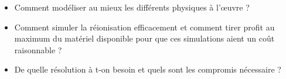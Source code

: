 \begin{itemize}
\item Comment modéliser au mieux les différents physiques à l’œuvre ?
\item Comment simuler la réionisation efficacement et comment tirer profit au maximum du matériel disponible pour que ces simulations aient un coût raisonnable ?
\item De quelle résolution à t-on besoin et quels sont les compromis nécessaire ?
\end{itemize}

%
%
%




